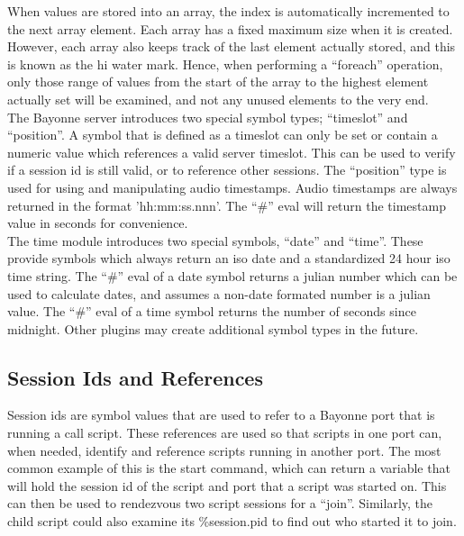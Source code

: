 \documentclass[a4paper,12pt]{article}
\begin{document}
When values are stored into an array, the index is automatically
incremented to the next array element.  Each array has a fixed maximum 
size when it is created.  However, each array also keeps track of the 
last element actually stored, and this is known as the hi water mark.  
Hence, when performing a ``foreach'' operation, only those range of 
values from the start of the array to the highest element actually set 
will be examined, and not any unused elements to the very end. \\

The Bayonne server introduces two special symbol types; ``timeslot'' and
``position''.  A symbol that is defined as a timeslot can only be set or
contain a numeric value which references a valid server timeslot.  This
can be used to verify if a session id is still valid, or to reference
other sessions.  The ``position'' type is used for using and manipulating
audio timestamps. Audio timestamps are always returned in the format
'hh:mm:ss.nnn'.  The ``\#'' eval will return the timestamp value in
seconds for convenience. \\

The time module introduces two special symbols, ``date'' and ``time''.  These
provide symbols which always return an iso date and a standardized 24 hour
iso time string.  The ``\#'' eval of a date symbol returns a julian number
which can be used to calculate dates, and assumes a non-date formated number
is a julian value.  The ``\#'' eval of a time symbol returns the number of
seconds since midnight.  Other plugins may create additional symbol types
in the future. \\

\subsection{Session Ids and References}

Session ids are symbol values that are used to refer to a Bayonne port 
that is running a call script.  These references are used so that scripts 
in one port can, when needed, identify and reference scripts running in 
another port.  The most common example of this is the start command, which 
can return a variable that will hold the session id of the script and port 
that a script was started on.  This can then be used to rendezvous two 
script sessions for a ``join''.  Similarly, the child script could also 
examine its \%session.pid to find out who started it to join. \\
\end{document}

